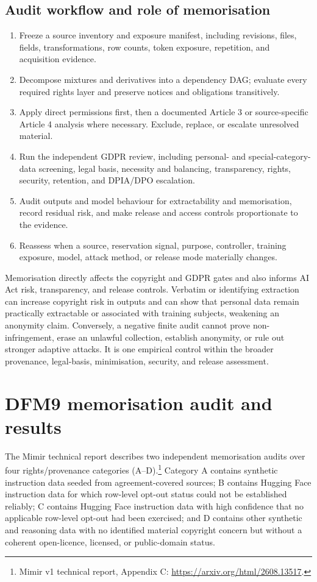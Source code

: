 \documentclass[9pt,a4paper]{article}
\begin{document}
\subsection{Audit workflow and role of memorisation}
\begin{enumerate}
\item Freeze a source inventory and exposure manifest, including revisions, files, fields, transformations, row counts, token exposure, repetition, and acquisition evidence.
\item Decompose mixtures and derivatives into a dependency DAG; evaluate every required rights layer and preserve notices and obligations transitively.
\item Apply direct permissions first, then a documented Article 3 or source-specific Article 4 analysis where necessary. Exclude, replace, or escalate unresolved material.
\item Run the independent GDPR review, including personal- and special-category-data screening, legal basis, necessity and balancing, transparency, rights, security, retention, and DPIA/DPO escalation.
\item Audit outputs and model behaviour for extractability and memorisation, record residual risk, and make release and access controls proportionate to the evidence.
\item Reassess when a source, reservation signal, purpose, controller, training exposure, model, attack method, or release mode materially changes.
\end{enumerate}
Memorisation directly affects the copyright and GDPR gates and also informs AI Act risk, transparency, and release controls. Verbatim or identifying extraction can increase copyright risk in outputs and can show that personal data remain practically extractable or associated with training subjects, weakening an anonymity claim. Conversely, a negative finite audit cannot prove non-infringement, erase an unlawful collection, establish anonymity, or rule out stronger adaptive attacks. It is one empirical control within the broader provenance, legal-basis, minimisation, security, and release assessment.
\section{DFM9 memorisation audit and results}
The Mimir technical report describes two independent memorisation audits over four rights/provenance categories (A--D).\footnote{Mimir v1 technical report, Appendix C: \url{https://arxiv.org/html/2608.13517}.} Category A contains synthetic instruction data seeded from agreement-covered sources; B contains Hugging Face instruction data for which row-level opt-out status could not be established reliably; C contains Hugging Face instruction data with high confidence that no applicable row-level opt-out had been exercised; and D contains other synthetic and reasoning data with no identified material copyright concern but without a coherent open-licence, licensed, or public-domain status.
\end{document}
